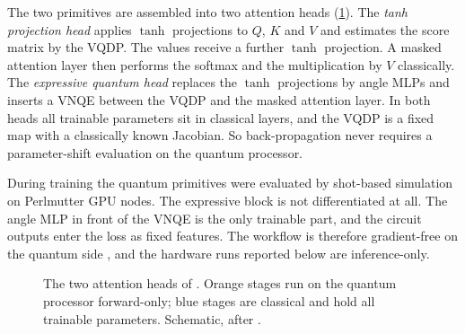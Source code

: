 The two primitives are assembled into two attention heads (\cref{fig:qml:vqt-heads}). The \emph{tanh projection head} applies $\tanh$ projections to $Q$, $K$ and $V$ and estimates the score matrix by the VQDP. The values receive a further $\tanh$ projection. A masked attention layer then performs the softmax and the multiplication by $V$ classically. The \emph{expressive quantum head} replaces the $\tanh$ projections by angle MLPs and inserts a VNQE between the VQDP and the masked attention layer. In both heads all trainable parameters sit in classical layers, and the VQDP is a fixed map with a classically known Jacobian. So back-propagation never requires a parameter-shift evaluation on the quantum processor.

During training the quantum primitives were evaluated by shot-based simulation on Perlmutter GPU nodes. The expressive block is not differentiated at all. The angle MLP in front of the VNQE is the only trainable part, and the circuit outputs enter the loss as fixed features. The workflow is therefore gradient-free on the quantum side \cite{guo2025vqt}, and the hardware runs reported below are inference-only.

\begin{figure}[htbp]
\centering
{}
\caption{The two attention heads of \vqt{}. Orange stages run on the quantum processor forward-only; blue stages are classical and hold all trainable parameters. Schematic, after \cite{guo2025vqt}.}\label{fig:qml:vqt-heads}
\end{figure}


